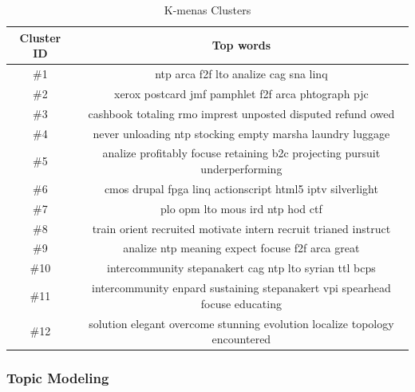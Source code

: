 \begin{table}[htbp]
\centering
\begin{tabular}{|c|c|}
\hline
Cluster ID & Top words\\
\hline
\#1 & ntp arca f2f lto analize cag sna linq\\
\hline
\#2 & xerox postcard jmf pamphlet f2f arca phtograph pjc\\
\hline
\#3 & cashbook totaling rmo imprest unposted disputed refund owed\\
\hline
\#4 & never unloading ntp stocking empty marsha laundry luggage\\
\hline
\#5 & analize profitably focuse retaining b2c projecting pursuit underperforming\\
\hline
\#6 & cmos drupal fpga linq actionscript html5 iptv silverlight\\
\hline
\#7 & plo opm lto mous ird ntp hod ctf\\
\hline
\#8 & train orient recruited motivate intern recruit trianed instruct \\
\hline
\#9 & analize ntp meaning expect focuse f2f arca great \\
\hline
\#10 & intercommunity stepanakert cag ntp lto syrian ttl bcps \\
\hline
\#11 & intercommunity enpard sustaining stepanakert vpi spearhead focuse educating \\
\hline
\#12 & solution elegant overcome stunning evolution localize topology encountered \\
\hline
\end{tabular}
\caption{K-menas Clusters}
\label{tbl:2}
\end{table}

\subsubsection{Topic Modeling}

